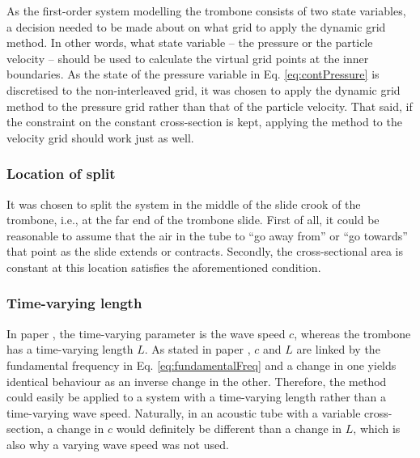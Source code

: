 As the first-order system modelling the trombone consists of two state variables, a decision needed to be made about on what grid to apply the dynamic grid method. In other words, what state variable -- the pressure or the particle velocity -- should be used to calculate the virtual grid points at the inner boundaries. As the state of the pressure variable in Eq. \eqref{eq:contPressure} is discretised to the non-interleaved grid, it was chosen to apply the dynamic grid method to the pressure grid rather than that of the particle velocity. That said, if the constraint on the constant cross-section is kept, applying the method to the velocity grid should work just as well.

\subsubsection{Location of split}
It was chosen to split the system in the middle of the slide crook of the trombone, i.e., at the far end of the trombone slide. First of all, it could be reasonable to assume that the air in the tube to ``go away from'' or ``go towards'' that point as the slide extends or contracts. Secondly, the cross-sectional area is constant at this location satisfies the aforementioned condition.

\subsubsection{Time-varying length}
In paper \citeP[G], the time-varying parameter is the wave speed $c$, whereas the trombone has a time-varying length $L$. As stated in paper \citeP[G], $c$ and $L$ are linked by the fundamental frequency in Eq. \eqref{eq:fundamentalFreq} and a change in one yields identical behaviour as an inverse change in the other. Therefore, the method could easily be applied to a system with a time-varying length rather than a time-varying wave speed. Naturally, in an acoustic tube with a variable cross-section, a change in $c$ would definitely be different than a change in $L$, which is also why a varying wave speed was not used.


